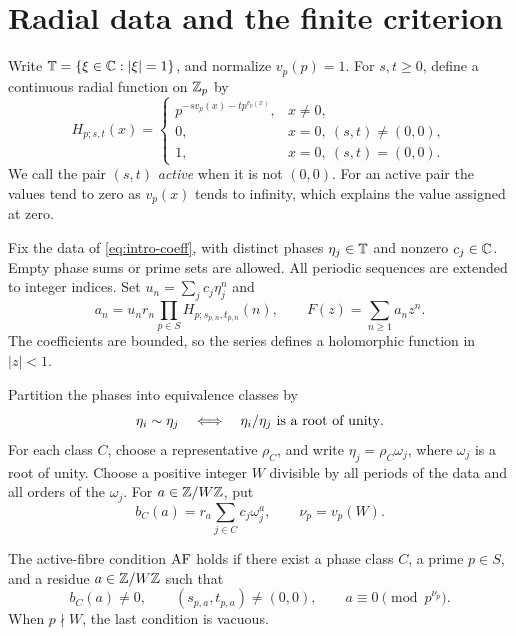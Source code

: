 \section{Radial data and the finite criterion}\label{sec:criterion}

Write \(\mathbb T=\{\xi\in\mathbb C:|\xi|=1\}\), and normalize \(v_p(p)=1\).
For \(s,t\geq0\), define a continuous radial function on \(\mathbb Z_p\) by
\begin{equation}\label{eq:kernel}
H_{p;s,t}(x)=
\begin{cases}
p^{-s v_p(x)-t p^{v_p(x)}},&x\ne0,\\
0,&x=0,\ (s,t)\ne(0,0),\\
1,&x=0,\ (s,t)=(0,0).
\end{cases}
\end{equation}
We call the pair \((s,t)\) \emph{active} when it is not \((0,0)\).
For an active pair the values tend to zero as \(v_p(x)\) tends to
infinity, which explains the value assigned at zero.

Fix the data of \eqref{eq:intro-coeff}, with distinct phases
\(\eta_j\in\mathbb T\) and nonzero \(c_j\in\mathbb C\). Empty phase sums or prime
sets are allowed. All periodic sequences are extended to integer
indices. Set \(u_n=\sum_jc_j\eta_j^n\) and
\[
a_n=u_nr_n\prod_{p\in S}H_{p;s_{p,n},t_{p,n}}(n),
\qquad F(z)=\sum_{n\geq1}a_nz^n.
\]
The coefficients are bounded, so the series defines a holomorphic
function in \(|z|<1\).

Partition the phases into equivalence classes by
\[
\eta_i\sim\eta_j
\quad\Longleftrightarrow\quad
\eta_i/\eta_j\ \hbox{is a root of unity}.
\]
For each class \(C\), choose a representative \(\rho_C\), and write
\(\eta_j=\rho_C\omega_j\), where \(\omega_j\) is a root of unity.
Choose a positive integer \(W\) divisible by all periods of the data
and all orders of the \(\omega_j\). For \(a\in\mathbb Z/W\mathbb Z\), put
\begin{equation}\label{eq:grouped}
b_C(a)=r_a\sum_{j\in C}c_j\omega_j^a,
\qquad \nu_p=v_p(W).
\end{equation}

\begin{definition}\label{def:af}
The active-fibre condition \(\mathrm{AF}\) holds if there exist a phase class
\(C\), a prime \(p\in S\), and a residue \(a\in\mathbb Z/W\mathbb Z\) such that
\begin{equation}\label{eq:af}
b_C(a)\ne0,\qquad
(s_{p,a},t_{p,a})\ne(0,0),\qquad
a\equiv0\pmod{p^{\nu_p}}.
\end{equation}
When \(p\nmid W\), the last condition is vacuous.
\end{definition}


